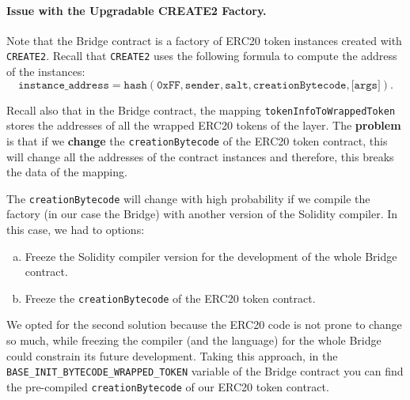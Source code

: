 \paragraph*{Issue with the Upgradable CREATE2 Factory.}

Note that the Bridge contract is a factory of ERC20 token instances
created with \texttt{CREATE2}. Recall that \texttt{CREATE2} uses the following formula to compute the address of the instances:
\[
\texttt{instance\_address} = \texttt{hash}(\texttt{0xFF}, \texttt{sender}, \texttt{salt}, \texttt{creationBytecode}, \texttt{[args]}).
\]

Recall also that in the Bridge contract, the mapping \texttt{tokenInfoToWrappedToken} stores the addresses of all the wrapped ERC20 tokens of the layer. The \textbf{problem} is that if we \textbf{change} the \texttt{creationBytecode} of the ERC20 token contract, this will change all the addresses of the contract instances and therefore, this breaks the data of the mapping.

The \texttt{creationBytecode} will change with high probability if we compile the factory (in our case the Bridge) with another version of the Solidity compiler. In this case, we had to options:
\begin{enumerate}[a)]
\item Freeze the Solidity compiler version for the development of the whole Bridge contract.
\item Freeze the \texttt{creationBytecode} of the ERC20 token contract.
\end{enumerate}

We opted for the second solution because the ERC20 code is not prone to change so much, while freezing the compiler (and the language) for the whole Bridge could constrain its future development. Taking this approach, in the \texttt{BASE\_INIT\_BYTECODE\_WRAPPED\_TOKEN} variable of the Bridge contract you can find the pre-compiled \texttt{creationBytecode} of our ERC20 token contract.
